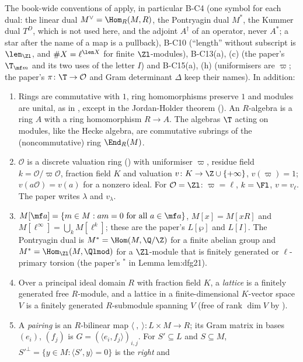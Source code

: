 \begin{convention}\label{conv:modules:rings}
The book-wide conventions of  apply, in particular B-C4 (one symbol for each dual: the linear dual
$M^\vee=\Hom_R(M,R)$, the Pontryagin dual $M^*$, the Kummer dual $T^D$, which is not used here, and the adjoint $A^\dagger$ of an
operator, never $A^*$; a star after the name of a map is a pullback), B-C10 (``length'' without subscript is $\len_{\Zl}$, and
$\#X=\ell^{\len X}$ for finite $\Zl$-modules), B-C13(a), (c) (the paper's $\T_{\mf m}$ and its two uses of the letter $I$) and
B-C15(a), (h) (uniformisers are $\varpi$; the paper's $\pi\colon\T\to\mathcal O$ and Gram determinant $\Delta$ keep their names). In addition:
\begin{enumerate}[label=(\alph*)]
\item Rings are commutative with $1$, ring homomorphisms preserve $1$ and modules are unital, as in , except in the
Jordan-Holder theorem (). An $R$-algebra is a ring $A$ with a ring homomorphism $R\to A$. The
algebras $\T$ acting on modules, like the Hecke algebra, are commutative subrings of the (noncommutative) ring $\End_R(M)$.
\item $\mathcal O$ is a discrete valuation ring () with uniformiser $\varpi$, residue field $k=\mathcal O/\varpi\mathcal O$,
fraction field $K$ and valuation $v\colon K\to\Z\cup\{+\infty\}$, $v(\varpi)=1$; $v(a\mathcal O)=v(a)$ for a nonzero ideal. For $\mathcal O=\Zl$:
$\varpi=\ell$, $k=\Fl$, $v=v_\ell$. The paper writes $\lambda$ and $v_\lambda$.
\item $M[\mf a]=\{m\in M:am=0\text{ for all }a\in\mf a\}$, $M[x]=M[xR]$ and $M[\ell^\infty]=\bigcup_kM[\ell^k]$; these are the paper's $L[\wp]$ and
$L[I]$. The Pontryagin dual is $M^*=\Hom(M,\Q/\Z)$ for a finite abelian group and $M^*=\Hom_{\Zl}(M,\Qlmod)$ for a $\Zl$-module that is
finitely generated or $\ell$-primary torsion (the paper's ${}^*$ in Lemma lem:dfg21).
\item Over a principal ideal domain $R$ with fraction field $K$, a \emph{lattice} is a finitely generated free $R$-module, and a lattice
in a finite-dimensional $K$-vector space $V$ is a finitely generated $R$-submodule spanning $V$ (free of rank $\dim V$ by
).
\item A \emph{pairing} is an $R$-bilinear map $\langle\ ,\ \rangle\colon L\times M\to R$; its Gram matrix in bases $(e_i)$, $(f_j)$ is
$G=(\langle e_i,f_j\rangle)_{i,j}$. For $S'\subseteq L$ and $S\subseteq M$, $S'^{\perp}=\{y\in M:\langle S',y\rangle=0\}$ is the \emph{right} and

\end{enumerate}
\end{convention}
